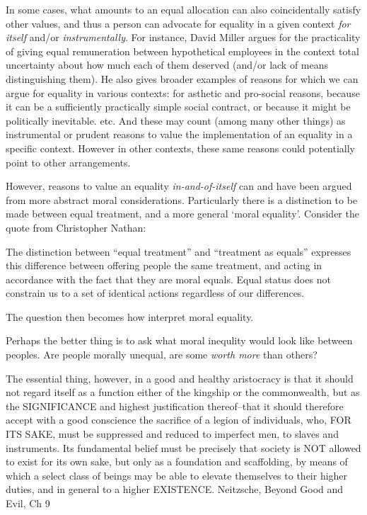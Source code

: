 \documentclass{article}
\begin{document}
In some cases, what amounts to an equal allocation can also coincidentally satisfy other values, and thus a person can advocate for equality in a given context \textit{for itself} and/or \textit{instrumentally}.
For instance, David Miller \cite{equalityandjustice:1998} argues for the practicality of giving equal remuneration between hypothetical employees in the context total uncertainty about how much each of them deserved (and/or lack of means distinguishing them). He also gives broader examples of reasons for which we can argue for equality in various contexts: for asthetic and pro-social reasons, because it can be a sufficiently practically simple social contract, or because it might be politically inevitable. etc.
And these may count (among many other things) as instrumental or prudent reasons to value the implementation of an equality in a specific context. However in other contexts, these same reasons could potentially point to other arrangements.

However, reasons to value an equality \textit{in-and-of-itself} can and have been argued from more abstract moral considerations.
Particularly there is a distinction to be made between equal treatment, and a more general `moral equality'.
Consider the quote from Christopher Nathan:

\begin{displayquote}
The distinction between ``equal treatment'' and ``treatment as equals'' expresses this difference between offering people the same treatment, and acting in accordance with the fact that they are moral equals. Equal status does not constrain us to a set of identical actions regardless of our differences.\cite{whatisbasicequalitynathan}
\end{displayquote}

The question then becomes how interpret moral equality.

Perhaps the better thing is to ask what moral inequlity would look like between peoples.
Are people morally unequal, are some \textit{worth more} than others?

\begin{displayquote}
The essential thing, however, in a good and healthy aristocracy is that it should not regard itself as a function either of the kingship or the commonwealth, but as the SIGNIFICANCE and highest justification thereof--that it should therefore accept with a good conscience the sacrifice of a legion of individuals, who, FOR ITS SAKE, must be suppressed and reduced to imperfect men, to slaves and instruments. Its fundamental belief must be precisely that society is NOT allowed to exist for its own sake, but only as a foundation and scaffolding, by means of which a select class of beings may be able to elevate themselves to their higher duties, and in general to a higher EXISTENCE.
\cite{NietzscheGutenberg} Neitzsche, Beyond Good and Evil, Ch 9
\end{displayquote}
\end{document}
